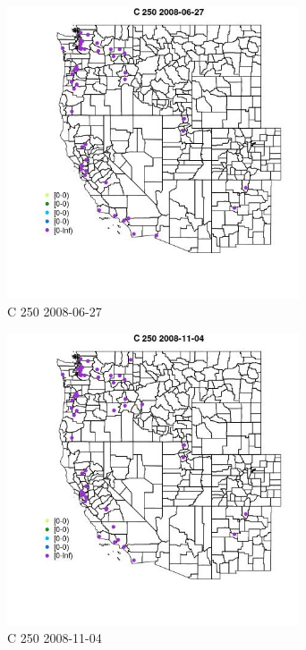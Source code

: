 \begin{figure} 
\centering  
\includegraphics[width=0.77\textwidth]{Code_Outputs/Report_ML_input_PM25_Step4_part_e_de_duplicated_aves_MapObsC_2502008-06-27.jpg} 
\caption{\label{fig:Report_ML_input_PM25_Step4_part_e_de_duplicated_avesMapObsC_2502008-06-27}C 250 2008-06-27} 
\end{figure} 
 

\begin{figure} 
\centering  
\includegraphics[width=0.77\textwidth]{Code_Outputs/Report_ML_input_PM25_Step4_part_e_de_duplicated_aves_MapObsC_2502008-11-04.jpg} 
\caption{\label{fig:Report_ML_input_PM25_Step4_part_e_de_duplicated_avesMapObsC_2502008-11-04}C 250 2008-11-04} 
\end{figure} 
 

